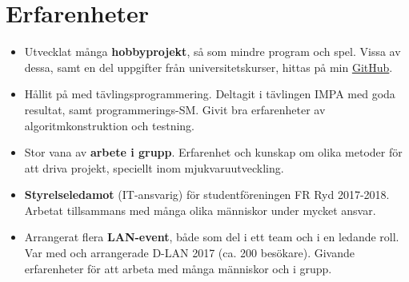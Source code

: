 \documentclass[12pt]{article}
\newcommand{\text}[2]{#2}
\newcommand{\text}[2]{#1}
\begin{document}
\section*{\text{Experiences}{Erfarenheter}}
\begin{itemize}
    \item \text{
            Developed multiple \textbf{hobby projects} such as smaller programs and video games. Some of these, as well as some university assignments, can be found on my \href{http://github.com/joeloskarsson}{GitHub}.
        }{
            Utvecklat många \textbf{hobbyprojekt}, så som mindre program och spel. Vissa av dessa, samt en del uppgifter från universitetskurser, hittas på min \href{http://github.com/joeloskarsson}{GitHub}.
        }

    \item \text{
            Experience with \textbf{competitive programming}. I have competed in the IMPA competition with good results and also taken part in the Nordic Collegiate Programming Contest. This has given me good training in algorithm construction and testing.
        }{
            Hållit på med tävlingsprogrammering. Deltagit i tävlingen IMPA med goda resultat, samt programmerings-SM. Givit bra erfarenheter av algoritmkonstruktion och testning.
        }

    \item \text{
            Plenty of experience \textbf{working in groups}. Good team player with experience and knowledge of different methodologies for software development.
        }{
            Stor vana av \textbf{arbete i grupp}. Erfarenhet och kunskap om olika metoder för att driva projekt, speciellt inom mjukvaruutveckling.
        }

    \item \text{
            \textbf{Board member} (IT Manager) of student association FR Ryd 2017-2018. Working with many different people and under a lot of responsibility.
        }{
            \textbf{Styrelseledamot} (IT-ansvarig) för studentföreningen FR Ryd 2017-2018. Arbetat tillsammans med många olika människor under mycket ansvar.
        }

    \item \text{
            Organized multiple \textbf{LAN-parties}, both as a member of a team and in a leading role. Part of the organizing team for D-LAN 2017 (around 200 visitors). Resulted in improved people skills and teamwork.
        }{
            Arrangerat flera \textbf{LAN-event}, både som del i ett team och i en ledande roll. Var med och arrangerade D-LAN 2017 (ca. 200 besökare). Givande erfarenheter för att arbeta med många människor och i grupp.
        }

\end{itemize}
\end{document}
